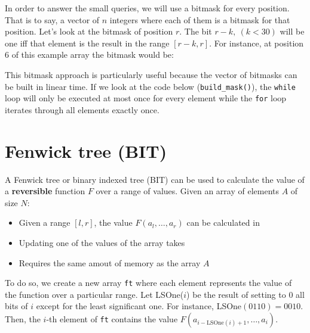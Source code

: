 \begin{figure}[h!]
		\centering
\end{figure}
\newpage
In order to answer the small queries, we will use a bitmask for every position. That
is to say, a vector of $n$ integers where each of them is a bitmask for that position.
Let's look at the bitmask of position $r$. The bit $r-k, \ (k<30)$ will 
be one iff that element  is the result in the range $[r-k, r]$.  
For instance, at position $6$ of this example array the bitmask would be:
\begin{figure}[h!]
\centering
{}
\end{figure}
This bitmask approach is particularly useful because the vector of bitmasks can be built in linear time. 
If we look at the code below (\texttt{build\_mask()}), the \texttt{while} loop 
will only be executed at most once for every element while 
the \texttt{for} loop iterates through all elements exactly once.





\newpage
\section{Fenwick tree (BIT)}
A Fenwick tree or binary indexed tree (BIT) can be used to calculate the value
of a \textbf{reversible} function $F$ over a range of values. Given an array of elements
$A$ of size $N$:
\begin{itemize}
		\setlength{\itemsep}{2pt}
		\item Given a range $[l,r]$, the value $F(a_l,\dots, a_r)$ can be calculated
				in 
		\item Updating one of the values of the array takes 
		\item Requires the same amout of memory as the array $A$
\end{itemize}
To do so, we create a new array \texttt{ft} where each element represents
the value of the function over a particular range. Let LSOne($i$) be the 
result of setting to 0 all bits of $i$ except for the least significant one.
For instance, LSOne$(0110)=0010$. Then, the $i$-th element of \texttt{ft} 
contains the value $F(a_{i-\text{LSOne}(i)+1},\dots, a_{i})$. 

